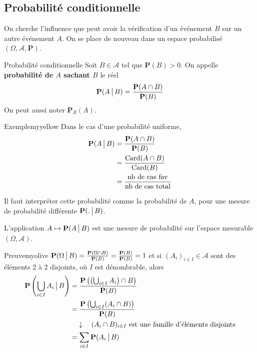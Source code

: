     \subsection{Probabilité conditionnelle}

    On cherche l’influence que peut avoir la vérification d’un événement $B$ sur un autre événement $A$. On se place de nouveau dans un espace probabilisé $(\Omega, \mathcal{A}, \mathbf{P})$.

    \begin{defi}{Probabilité conditionnelle}{}
        Soit $B \in \mathcal{A}$ tel que $\mathbf{P}(B) > 0$. On appelle \textbf{probabilité de $A$ sachant $B$} le réel 
        \[ \mathbf{P}(A \, \big| \, B) = \frac{\mathbf{P}(A \cap B)}{\mathbf{P}(B)} \]   
        On peut aussi noter $\mathbf{P}_B(A)$. 
    \end{defi}

    \begin{omed}{Exemple}{myyellow}
        Dans le cas d’une probabilité uniforme, 
        \begin{align*}
            \mathbf{P}(A \, \big| \, B) 
            &= \frac{\mathbf{P}(A \cap B)}{\mathbf{P}(B)} \\
            &= \frac{\operatorname{Card}(A \cap B)}{\operatorname{Card}(B)} \\
            &= \frac{\text{nb de cas fav}}{\text{nb de cas total}}
        \end{align*}
    \end{omed}

    Il faut interpréter cette probabilité comme la probabilité de $A$, pour une mesure de probabilité différente $\mathbf{P}(. \, \big| \, B)$. 

    \begin{prop}{}{}
        L’application $A \mapsto \mathbf{P}(A \, \big| \, B)$ est une mesure de probabilité sur l’espace mesurable $(\Omega, \mathcal{A})$. 
    \end{prop}

    \begin{demo}{Preuve}{myolive}
        $\mathbf{P}(\Omega \, \big| \, B) = \frac{\mathbf{P}(\Omega \cap B)}{\mathbf{P}(B)} = \frac{\mathbf{P}(B)}{\mathbf{P}(B)} = 1$ et si $(A_i)_{i \in I} \in \mathcal{A}$ sont des éléments 2 à 2 disjoints, où $I$ est dénombrable, alors 
        \begin{align*}
            \mathbf{P}\left(\bigcup_{i \in I} A_i \, \big| \, B\right) 
            &= \frac{\mathbf{P}\left(\left(\bigcup_{i \in I} A_i\right) \cap B\right)}{\mathbf{P}(B)} \\
            &= \frac{\mathbf{P}\left(\bigcup_{i \in I} (A_i \cap B)\right)}{\mathbf{P}(B)} \\
            &\quad \downarrow \quad (A_i \cap B)_{i \in I} \text{ est une famille d’éléments disjoints} \\
            &= \sum_{i \in I} \mathbf{P}(A_i \, \big| \, B) \\
        \end{align*}
    \end{demo}

